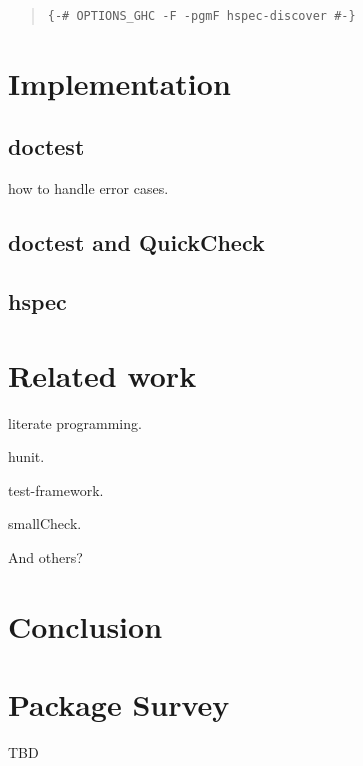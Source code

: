 \documentclass[preprint]{sigplanconf}
\begin{document}
\begin{quote}
\begin{verbatim}
{-# OPTIONS_GHC -F -pgmF hspec-discover #-}
\end{verbatim}
\end{quote}

\section{Implementation}

\subsection{doctest}

how to handle error cases.

\subsection{doctest and QuickCheck}

\subsection{hspec}

\section{Related work}

literate programming.

hunit.

test-framework.

smallCheck.

And others?

\section{Conclusion}

\appendix

\section{Package Survey}

TBD
\end{document}
